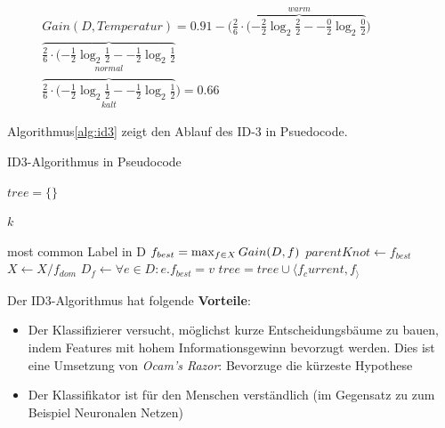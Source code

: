 \begin{equation}
\begin{split}
Gain(D,Temperatur) =  0.91 - \Big( \overbrace{\frac{2}{6} \cdot (-\frac{2}{2} \log_{2} \frac{2}{2} -  -\frac{0}{2} \log_{2} \frac{0}{2} }^{warm}   ) \quad \quad \quad \quad \\
\overbrace{\frac{2}{6} \cdot (-\frac{1}{2} \log_{2} \frac{1}{2} -  -\frac{1}{2} \log_{2} \frac{1}{2} }_{normal}   \quad \quad \quad \quad \\
\overbrace{\frac{2}{6} \cdot (-\frac{1}{2} \log_{2} \frac{1}{2} -  -\frac{1}{2} \log_{2} \frac{1}{2} }_{kalt} 
  \Big)  = 0.66
\end{split}
\end{equation}

Algorithmus\ref{alg:id3} zeigt den Ablauf des ID-3 in Psuedocode. 

\begin{algorithm}[H]
	\caption{ID3-Algorithmus in Pseudocode}
	\label{alg:id3}
	\begin{algorithmic}[1]
		\State $tree = \{ \}$
		
			\State \Return $k$
	
		\Else
				\State \Return most common Label in D
			\Else
				\State $f_{best} = \operatorname*{max}_{f \in X} Gain(D,f)$
				\State $parentKnot \gets f_{best}$
				\State $X \gets X / f_{dom}$
						\State $D_f \gets \forall e \in D : e.f_{best} = v$
						\State \Call{CalcSquare}{$a$}
						\State $tree = tree \cup \langle f_current, f_ \rangle$
				\EndFor
			\EndIf
		\EndIf
		
		\EndFunction
		
	\end{algorithmic}
\end{algorithm}

Der ID3-Algorithmus hat folgende \textbf{Vorteile}:

\begin{itemize}
\item Der Klassifizierer versucht, möglichst kurze Entscheidungsbäume zu bauen, indem Features mit hohem Informationsgewinn bevorzugt werden. Dies ist eine Umsetzung von \emph{Ocam's Razor}: \glqq Bevorzuge die kürzeste Hypothese\grqq{}
\item  Der Klassifikator ist für den Menschen verständlich (im Gegensatz zu zum Beispiel Neuronalen Netzen)\cite[S. 65]{machine_mitchell}
\end{itemize}

